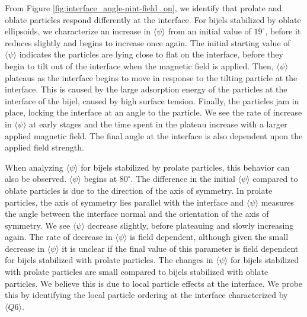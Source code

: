 From Figure \ref{fig:interface_angle-nint-field_on}, we identify that
prolate and oblate particles respond differently at the interface. For
bijels stabilized by oblate ellipsoids, we characterize an increase in
\(\langle \psi \rangle\) from an initial value of \(19 ^{\circ}\),
before it reduces slightly and begins to increase once again. The
initial starting value of \(\langle \psi \rangle\) indicates the
particles are lying close to flat on the interface, before they begin to
tilt out of the interface when the magnetic field is applied. Then,
\(\langle \psi \rangle\) plateaus as the interface begins to move in
response to the tilting particle at the interface. This is caused by the
large adsorption energy of the particles at the interface of the bijel,
caused by high surface tension. Finally, the particles jam in place,
locking the interface at an angle to the particle. We see the rate of
increase in \(\langle \psi \rangle\) at early stages and the time spent
in the plateau increase with a larger applied magnetic field. The final
angle at the interface is also dependent upon the applied field
strength.

When analyzing \(\langle \psi \rangle\) for bijels stabilized by prolate
particles, this behavior can also be observed. \(\langle \psi \rangle\)
begins at \(80 ^{\circ}\). The difference in the initial
\(\langle \psi \rangle\) compared to oblate particles is due to the
direction of the axis of symmetry. In prolate particles, the axis of
symmetry lies parallel with the interface and \(\langle \psi \rangle\)
measures the angle between the interface normal and the orientation of
the axis of symmetry. We see \(\langle \psi \rangle\) decrease slightly,
before plateauing and slowly increasing again. The rate of decrease in
\(\langle \psi \rangle\) is field dependent, although given the small
decrease in \(\langle \psi \rangle\) it is unclear if the final value of
this parameter is field dependent for bijels stabilized with prolate
particles. The changes in \(\langle \psi \rangle\) for bijels stabilized
with prolate particles are small compared to bijels stabilized with
oblate particles. We believe this is due to local particle effects at
the interface. We probe this by identifying the local particle ordering
at the interface characterized by \(\langle Q6 \rangle\).

